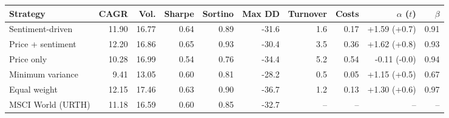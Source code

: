 \begin{tabular}{lrrrrrrrrr}
\toprule
Strategy & CAGR & Vol. & Sharpe & Sortino & Max DD & Turnover & Costs & $\alpha$ ($t$) & $\beta$ \\
\midrule
Sentiment-driven & 11.90 & 16.77 & 0.64 & 0.89 & -31.6 & 1.6 & 0.17 & +1.59 (+0.7) & 0.91 \\
Price + sentiment & 12.20 & 16.86 & 0.65 & 0.93 & -30.4 & 3.5 & 0.36 & +1.62 (+0.8) & 0.93 \\
Price only & 10.28 & 16.99 & 0.54 & 0.76 & -34.4 & 5.2 & 0.54 & -0.11 (-0.0) & 0.94 \\
Minimum variance & 9.41 & 13.05 & 0.60 & 0.81 & -28.2 & 0.5 & 0.05 & +1.15 (+0.5) & 0.67 \\
Equal weight & 12.15 & 17.46 & 0.63 & 0.90 & -36.7 & 1.2 & 0.13 & +1.30 (+0.6) & 0.97 \\
MSCI World (URTH) & 11.18 & 16.59 & 0.60 & 0.85 & -32.7 & -- & -- & -- & -- \\
\bottomrule
\end{tabular}

